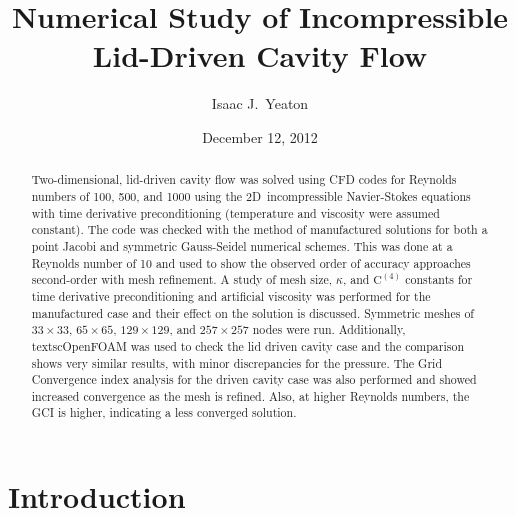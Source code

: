 \documentclass[10pt, letterpaper]{article}
\title{Numerical Study of Incompressible Lid-Driven Cavity Flow}
\author{Isaac J.~Yeaton}
\date{December 12, 2012}
\newcommand{\mesh}[1]{${#1} \times {#1}$}
\begin{document}
\maketitle
\thispagestyle{empty}


\begin{abstract}
	Two-dimensional, lid-driven cavity flow was solved using CFD codes for 
	Reynolds numbers
	of 100, 500, and 1000 using the 2D~incompressible Navier-Stokes equations
	with time derivative preconditioning (temperature and viscosity were assumed
	constant).  The code was checked with the method of manufactured solutions
	for both a point Jacobi and symmetric Gauss-Seidel numerical schemes.  This
	was done at a Reynolds number of 10 and used to show the observed order of
	accuracy approaches second-order with mesh refinement.  A study of mesh size,
	$\kappa$, and $\mathrm{C^{(4)}}$ constants
	for time derivative preconditioning and artificial viscosity was performed for 
	the manufactured case and their effect on the solution is	discussed.  
	Symmetric meshes
	of \mesh{33}, \mesh{65}, \mesh{129}, and \mesh{257} nodes were run. 
	Additionally, textsc{OpenFOAM} was used to check the lid driven cavity case
	and the comparison shows very similar results, with minor discrepancies
	for the pressure.  The Grid Convergence index analysis for the driven cavity case
	was also performed and showed increased convergence as the mesh is refined.  Also,
	at higher Reynolds numbers, the GCI is higher, indicating a less converged
	solution.
\end{abstract}


\section{Introduction}
\end{document}
